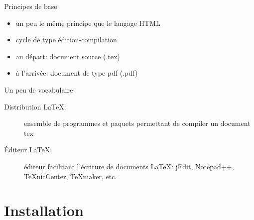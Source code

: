 \documentclass{beamer}
\begin{document}

\begin{frame}{Principes de base}
    \begin{itemize}
        \item un peu le même principe que le langage HTML
        \item cycle de type édition-compilation
        \item au départ: document source (.tex)
        \item à l'arrivée: document de type pdf (.pdf)
    \end{itemize}
\end{frame}

\begin{frame}{Un peu de vocabulaire}
    \begin{description}
        \item[Distribution \LaTeX :] ensemble de programmes et paquets permettant de compiler un document tex
        \item[Éditeur \LaTeX       :] éditeur facilitant l'écriture de documents \LaTeX: jEdit, Notepad++, TeXnicCenter, TeXmaker, etc.
    \end{description}
\end{frame}



\section{Installation} 
\end{document}
